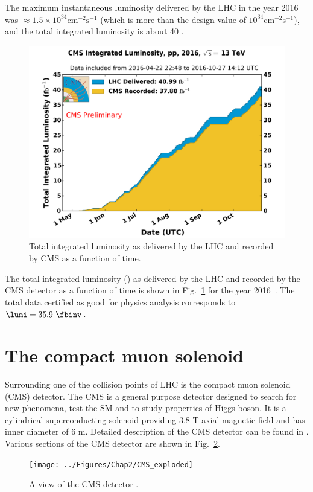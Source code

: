 The maximum instantaneous luminosity delivered by the LHC in the year 2016 was $\approx1.5\times 10^{34} \mathrm{cm}^{-2}\mathrm{s}^{-1}$ \cite{lumicms} 
(which is more than the design value of $10^{34} \mathrm{cm}^{-2}\mathrm{s}^{-1}$), and the total integrated luminosity is about 40 \fbinv.
\begin{figure}[h!]
\centering
\includegraphics[width=0.7\linewidth]{../Figures/Chap2/int_lumi_per_day_cumulative_pp_2016}
\caption[Integrated luminosity of data]{Total integrated luminosity as delivered by the LHC and recorded by CMS as a function of time.}
\label{fig:int_lumi_per_day_cumulative_pp_2016}
\end{figure}
The total integrated luminosity (\lumi) as delivered by the LHC and recorded by the CMS detector as a function of time is shown in 
Fig.~\ref{fig:int_lumi_per_day_cumulative_pp_2016} for the year 2016~\cite{lumicms}. The total data certified as good for physics analysis 
corresponds to $\lumi = 35.9\ \fbinv$.

\section{The compact muon solenoid}
Surrounding one of the collision points of LHC is the compact muon solenoid (CMS) detector. The CMS is a general purpose detector designed to 
search for new phenomena, test the SM and to study properties of Higgs boson. It is a cylindrical superconducting solenoid providing 3.8 T 
axial magnetic field and has inner diameter of 6 m. Detailed description of the CMS detector can be found in \cite{Chatrchyan:2008aa}. 
Various sections of the CMS detector are shown in Fig.~\ref{fig:CMS_exploded}.
\begin{figure}[h!]
\centering
\texttt{[image: ../Figures/Chap2/CMS\_exploded]}
\caption[CMS detector view]{A view of the CMS detector \cite{Chatrchyan:2008aa}.}
\label{fig:CMS_exploded}
\end{figure}

